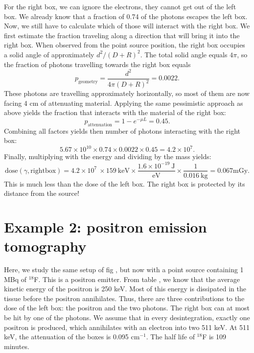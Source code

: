 For the right box, we can ignore the electrons, they cannot get out of the
left box.  We already know that a fraction of 0.74 of the photons escapes the
left box. Now, we still have to calculate which of those will interact with
the right box. We first estimate the fraction traveling along a direction that
will bring it into the right box.  When observed from the point source
position, the right box occupies a solid angle of approximately $d^2 / (D +
R)^2$. The total solid angle equals $4 \pi$, so the fraction of photons
travelling towards the right box equals
\begin{equation}
  p_{\mbox{geometry}} = \frac{d^2}{4 \pi (D + R)^2} = 0.0022.
\end{equation}
These photons are travelling approximately horizontally, so most of them are
now facing 4 cm of attenuating material. Applying the same pessimistic
approach as above yields the fraction that interacts with the material of the
right box:
\begin{equation}
  p_{\mbox{attenuation}} = 1 - e^{- \mu L} = 0.45.
\end{equation}
Combining all factors yields then number of photons interacting with the right box:
\begin{equation}
  5.67 \times 10^{10} \times 0.74 \times 0.0022 \times 0.45 = 4.2 \times 10^7.
\end{equation}
Finally, multiplying with the energy and dividing by the mass yields:
\begin{equation}
  \mbox{dose}(\gamma, \mbox{rightbox}) = 4.2 \times 10^7\ \times 159\ \mbox{keV}
  \times \frac{1.6 \times 10^{-19} \ \mbox{J}}{\mbox{eV}}
   \times \frac{1}{ 0.016 \ \mbox{kg}}
   = 0.067 \mbox{mGy}.
\end{equation}
This is much less than the dose of the left box. The right box is protected by its
distance from the source!


\section{Example 2: positron emission tomography}
Here, we study the same setup of fig , but
now with a point source containing 1 MBq of $^{18}$F. This is a
positron emitter. From table , we know that
the average kinetic energy of the positron is 250 keV. Most of this
energy is dissipated in the tissue before the positron
annihilates. Thus, there are three contributions to the dose of the
left box: the positron and the two photons. The right box can at most
be hit by one of the photons.
%
We assume that in every desintegration, exactly one positron is
produced, which annihilates with an electron into two 511 keV.  At 511
keV, the attenuation of the boxes is 0.095 cm$^{-1}$. The half life of
$^{18}$F is 109 minutes.

